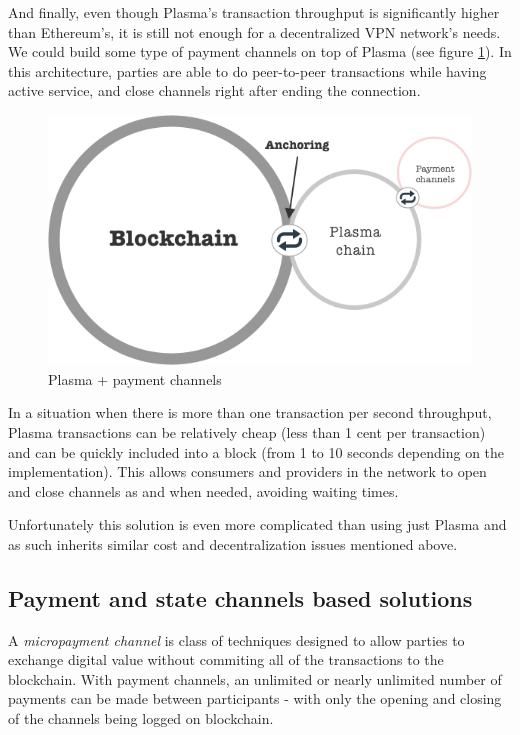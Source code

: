 \documentclass[a4paper,12pt]{article}
\begin{document}
And finally, even though Plasma’s transaction throughput is significantly higher 
than Ethereum’s, it is still not enough for a decentralized VPN network’s needs. 
We could build some type of payment channels on top of Plasma (see figure
\ref{img:plasma-channels}). In this architecture, parties are able to do 
peer-to-peer transactions while having active service, and close channels right 
after ending the connection.

\begin{figure}[H]
    \centering
    \includegraphics[scale=0.5]{../img/plasma-channels}
    \caption{Plasma + payment channels}
    \label{img:plasma-channels}
\end{figure}

In a situation when there is more than one transaction per second throughput, 
Plasma transactions can be relatively cheap (less than 1 cent per transaction) and 
can be quickly included into a block (from 1 to 10 seconds depending on the 
implementation). This allows consumers and providers in the network to open and 
close channels as and when needed, avoiding waiting times. 

Unfortunately this solution is even more complicated than using just Plasma and as 
such inherits similar cost and decentralization issues mentioned above.

\subsection{Payment and state channels based solutions}

A \textit{micropayment channel} is class of techniques designed to allow parties
to exchange digital value without commiting all of the transactions to the 
blockchain. With payment channels, an unlimited or nearly unlimited number of 
payments can be made between participants - with only the opening and closing of 
the channels being logged on blockchain. 
\end{document}
